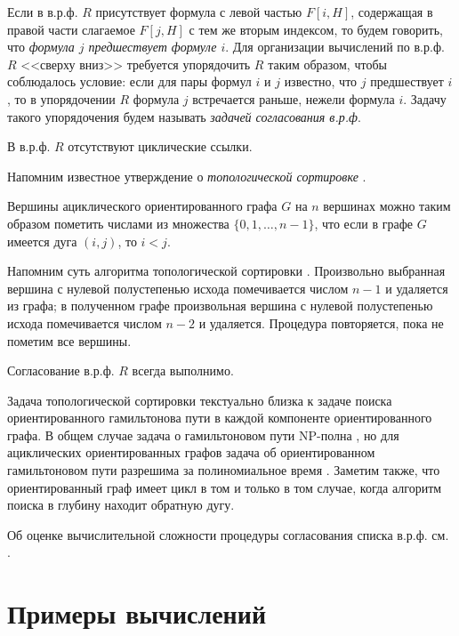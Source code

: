 Если в в.р.ф. $R$ присутствует формула с левой частью $F[i,H]$, содержащая в правой части слагаемое $F[j,H]$ с тем же вторым индексом, то будем говорить, что \textit{ формула $j$ предшествует формуле $i$}. Для организации вычислений по в.р.ф. $R$ <<сверху вниз>> требуется упорядочить $R$ таким образом, чтобы соблюдалось условие: если для пары формул $i$ и $j$ известно, что $j$ предшествует $i$, то в упорядочении $R$ формула $j$ встречается раньше, нежели формула $i$. Задачу такого упорядочения будем называть \textit{ задачей согласования в.р.ф}.

\label{the6}
В в.р.ф. $R$ отсутствуют циклические ссылки.


Напомним известное утверждение о \textit{ топологической сортировке}
\cite{akm_13}.

\label{the7}
Вершины ациклического ориентированного графа $G$ на $n$ вершинах можно таким образом пометить числами из множества $\{0, 1, \dots, n-1\}$, что если в графе $G$ имеется дуга $(i,j)$, то $i<j$.


Напомним суть алгоритма топологической сортировки \cite{akm_13}. Произвольно выбранная вершина с нулевой полустепенью исхода помечивается числом $n-1$ и удаляется из графа; в полученном графе произвольная вершина с нулевой полустепенью исхода помечивается числом $n-2$ и удаляется. Процедура повторяется, пока не пометим все вершины.

\label{the8}
Согласование в.р.ф. $R$ всегда выполнимо.


\begin{remark} Задача топологической сортировки текстуально близка к задаче поиска ориентированного гамильтонова пути в каждой компоненте ориентированного графа. В общем случае задача о гамильтоновом пути NP-полна \cite{akm_14}, но для ациклических ориентированных графов задача об ориентированном гамильтоновом пути разрешима за полиномиальное время
\cite{akm_15}. Заметим также, что ориентированный граф имеет цикл в том и только в том случае, когда алгоритм поиска в глубину \cite{akm_16} находит обратную дугу.

Об оценке вычислительной сложности процедуры согласования списка в.р.ф. см. \cite{akm_17}.
\end{remark}






\section{
Примеры вычислений %
}

